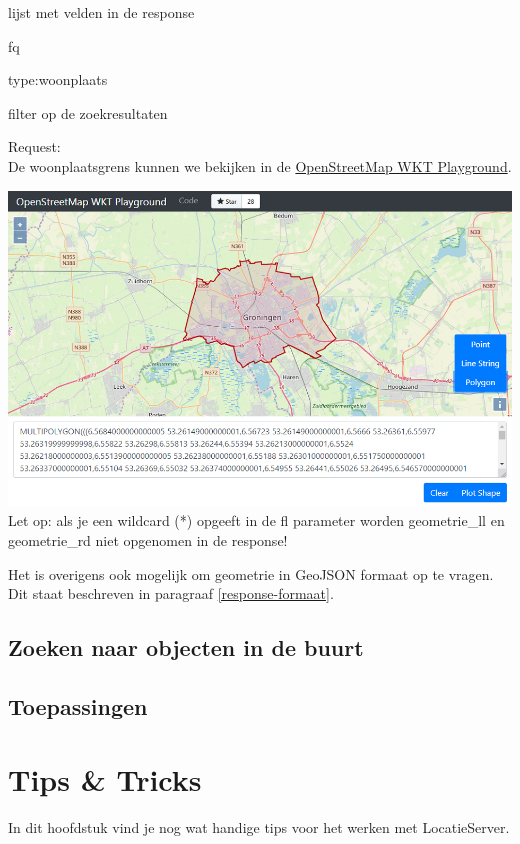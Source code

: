 \documentclass[]{book}
\begin{document}
lijst met velden in de response

{fq}

{type:woonplaats}

filter op de zoekresultaten

Request:\\

De woonplaatsgrens kunnen we bekijken in de \href{https://clydedacruz.github.io/openstreetmap-wkt-playground/}{OpenStreetMap WKT Playground}.

\includegraphics[width=1\linewidth]{images/img02}
Let op: als je een wildcard (*) opgeeft in de {fl} parameter worden {geometrie\_ll} en {geometrie\_rd} niet opgenomen in de response!

Het is overigens ook mogelijk om geometrie in GeoJSON formaat op te vragen. Dit staat beschreven in paragraaf \ref{response-formaat}.

\hypertarget{zoeken-naar-objecten-in-de-buurt}{%
\section{Zoeken naar objecten in de buurt}\label{zoeken-naar-objecten-in-de-buurt}}

\hypertarget{toepassingen}{%
\section{Toepassingen}\label{toepassingen}}

\hypertarget{tips-tricks}{%
\chapter{Tips \& Tricks}\label{tips-tricks}}

In dit hoofdstuk vind je nog wat handige tips voor het werken met LocatieServer.
\end{document}
